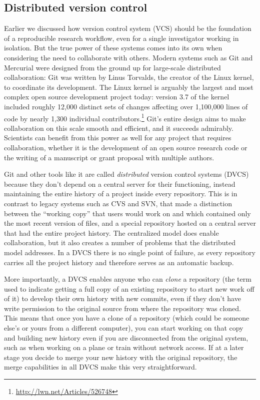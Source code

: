 \documentclass[ChapterTOCs,krantz2]{krantz} %
\begin{document}
\subsection{Distributed version control}

Earlier we discussed how version control system (VCS) should be the foundation
of a reproducible research workflow, even for a single investigator working in
isolation.  But the true power of these systems comes into its own when
considering the need to collaborate with others.  Modern systems such as Git
and Mercurial were designed from the ground up for large-scale distributed
collaboration: Git was written by Linus Torvalds, the creator of the Linux
kernel, to coordinate its development.  The Linux kernel is arguably the
largest and most complex open source development project today: version
3.7 of the kernel included roughly 12,000 distinct sets of changes affecting
over 1,100,000 lines of code by nearly 1,300 individual
contributors.\footnote{\url{http://lwn.net/Articles/526748}}  Git's entire
design aims to make collaboration on this scale smooth and efficient, and it
succeeds admirably.  Scientists can benefit from this power as well
for any project that requires collaboration, whether it is the development of
an open source research code or the writing of a manuscript or grant proposal
with multiple authors.

Git and other tools like it are called \emph{distributed} version control
systems (DVCS) because they don't depend on a central server for their
functioning, instead maintaining the entire history of a project inside every
repository.  This is in contrast to legacy systems such as CVS and SVN, that
made a distinction between the ``working copy'' that users would work on and
which contained only the most recent version of files, and a special repository
hosted on a central server that had the entire project history.  The
centralized model does enable collaboration, but it also creates a number of
problems that the distributed model addresses.  In a DVCS there is no single
point of failure, as every repository carries all the project history and
therefore serves as an automatic backup.

More importantly, a DVCS enables anyone who can \emph{clone} a repository (the
term used to indicate getting a full copy of an existing repository to start
new work off of it) to develop their own history with new commits, even if they
don't have write permission to the original source from where the repository
was cloned.  This means that once you have a clone of a repository (which could
be someone else's or yours from a different computer), you can start working on
that copy and building new history even if you are disconnected from the
original system, such as when working on a plane or train without network
access.  If at a later stage you decide to merge your new history with the
original repository, the merge capabilities in all DVCS make this very
straightforward.
\end{document}
